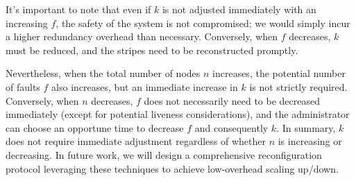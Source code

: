 It's important to note that even if $k$ is not adjusted immediately with an increasing $f$, the safety of the system is not compromised; we would simply incur a higher redundancy overhead than necessary.
Conversely, when $f$ decreases, $k$ must be reduced, and the stripes need to be reconstructed promptly.

Nevertheless, when the total number of nodes $n$ increases, the potential number of faults $f$ also increases, but an immediate increase in $k$ is not strictly required.
Conversely, when $n$ decreases, $f$ does not necessarily need to be decreased immediately (except for potential liveness considerations), and the administrator can choose an opportune time to decrease $f$ and consequently $k$.
In summary, $k$ does not require immediate adjustment regardless of whether $n$ is increasing or decreasing.
In future work, we will design a comprehensive reconfiguration protocol leveraging these techniques to achieve low-overhead scaling up/down.
